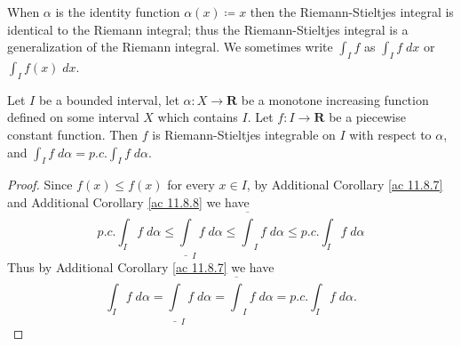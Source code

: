 \begin{note}
    When \(\alpha\) is the identity function \(\alpha(x) \coloneqq x\) then the Riemann-Stieltjes integral is identical to the Riemann integral;
    thus the Riemann-Stieltjes integral is a generalization of the Riemann integral.
    We sometimes write \(\int_I f\) as \(\int_I f \; dx\) or \(\int_I f(x) \; dx\).
\end{note}

\begin{additional corollary}\label{ac 11.8.9}
Let \(I\) be a bounded interval, let \(\alpha : X \to \mathbf{R}\) be a monotone increasing function defined on some interval \(X\) which contains \(I\).
Let \(f : I \to \mathbf{R}\) be a piecewise constant function.
Then \(f\) is Riemann-Stieltjes integrable on \(I\) with respect to \(\alpha\), and \(\int_I f \; d \alpha = p.c. \int_I f \; d \alpha\).
\end{additional corollary}

\begin{proof}
    Since \(f(x) \leq f(x)\) for every \(x \in I\), by Additional Corollary \ref{ac 11.8.7} and Additional Corollary \ref{ac 11.8.8} we have
    \[
        p.c. \int_I f \; d \alpha \leq \underline{\int}_I f \; d \alpha \leq \overline{\int}_I f \; d \alpha \leq p.c. \int_I f \; d \alpha
    \]
    Thus by Additional Corollary \ref{ac 11.8.7} we have
    \[
        \int_I f \; d \alpha = \underline{\int}_I f \; d \alpha = \overline{\int}_I f \; d \alpha = p.c. \int_I f \; d \alpha.
    \]
\end{proof}

